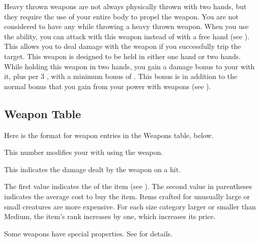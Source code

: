     Heavy thrown weapons are not always physically thrown with two hands, but they require the use of your entire body to propel the weapon.
    You are not considered to have any  while throwing a heavy thrown weapon.
     When you use the  ability, you can attack with this weapon instead of with a free hand (see ).
    This allows you to deal damage with the weapon if you successfully trip the target.
     This weapon is designed to be held in either one hand or two hands.
    While holding this weapon in two hands, you gain a  damage bonus to your  with it, plus  per 3 , with a minimum bonus of .
    This bonus is in addition to the normal bonus that you gain from your power with weapons (see ).

  \subsection{Weapon Table}
    Here is the format for weapon entries in the Weapons table, below.

     This number modifies your  with  using the weapon.

     This  indicates the damage dealt by the weapon on a hit.

     The first value indicates the  of the item (see ).
    The second value in parentheses indicates the average cost to buy the item.
    Items crafted for unusually large or small creatures are more expensive.
    For each size category larger or smaller than Medium, the item's rank increases by one, which increases its price.

     Some weapons have special properties. See  for details.

